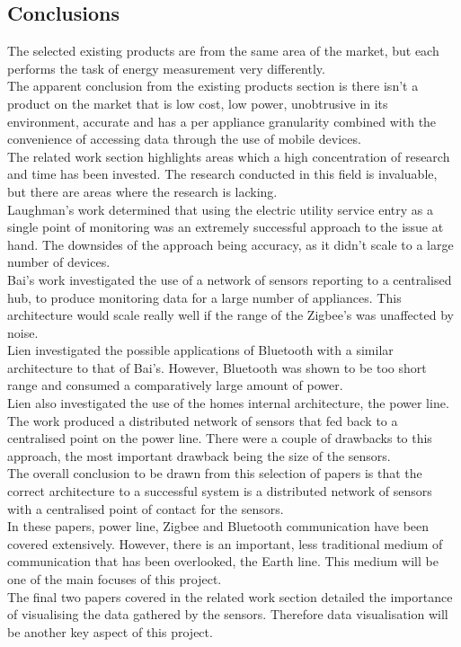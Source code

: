 \documentclass[draft,preprint,12pt,3p]{elsarticle}
\begin{document}
\subsection{Conclusions}
The selected existing products are from the same area of the market, but each performs the task of energy measurement very differently.\\
The apparent conclusion from the existing products section is there isn't a product on the market that is low cost, low power, unobtrusive in its environment, accurate and has a per appliance granularity combined with the convenience of accessing data through the use of mobile devices.\\
The related work section highlights areas which a high concentration of research and time has been invested. The research conducted in this field is invaluable, but there are areas where the research is lacking.\\
Laughman's work determined that using the electric utility service entry as a single point of monitoring was an extremely successful approach to the issue at hand. The downsides of the approach being accuracy, as it didn't scale to a large number of devices.\\
Bai's work investigated the use of a network of sensors reporting to a centralised hub, to produce monitoring data for a large number of appliances. This architecture would scale really well if the range of the Zigbee's was unaffected by noise.\\
Lien investigated the possible applications of Bluetooth with a similar architecture to that of Bai's. However, Bluetooth was shown to be too short range and consumed a comparatively large amount of power.\\
Lien also investigated the use of the homes internal architecture, the power line. The work produced a distributed network of sensors that fed back to a centralised point on the power line. There were a couple of drawbacks to this approach, the most important drawback being the size of the sensors.\\
The overall conclusion to be drawn from this selection of papers is that the correct architecture to a successful system is a distributed network of sensors with a centralised point of contact for the sensors.\\
In these papers, power line, Zigbee and Bluetooth communication have been covered extensively. However, there is an important, less traditional medium of communication that has been overlooked, the Earth line. This medium will be one of the main focuses of this project.\\
The final two papers covered in the related work section detailed the importance of visualising the data gathered by the sensors. Therefore data visualisation will be another key aspect of this project.
\end{document}
